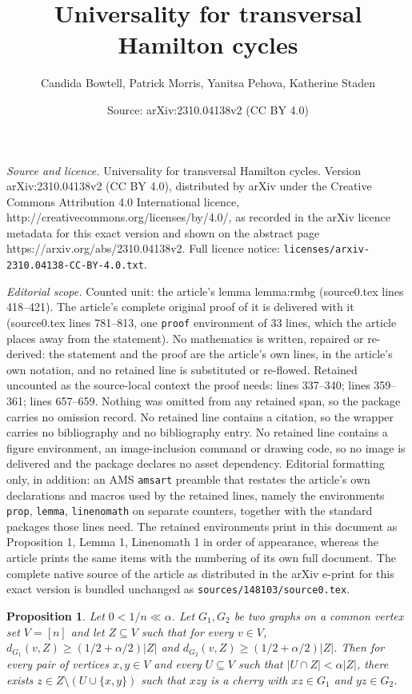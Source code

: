 \documentclass[10pt,a4paper]{amsart}
\title{Universality for transversal Hamilton cycles}
\author{Candida Bowtell, Patrick Morris, Yanitsa Pehova, Katherine Staden}
\date{Source: arXiv:2310.04138v2 (CC BY 4.0)}
\newtheorem{prop}{Proposition}
\begin{document}
\maketitle

\noindent\emph{Source and licence.} Universality for transversal Hamilton cycles. Version arXiv:2310.04138v2 (CC BY 4.0), distributed by arXiv under the Creative Commons Attribution 4.0 International licence, http://creativecommons.org/licenses/by/4.0/, as recorded in the arXiv licence metadata for this exact version and shown on the abstract page https://arxiv.org/abs/2310.04138v2. Full licence notice: \texttt{licenses/arxiv-2310.04138-CC-BY-4.0.txt}.\par\smallskip

\noindent\textit{Editorial scope.} Counted unit: the article's lemma lemma:rmbg (source0.tex lines 418--421). The article's complete original proof of it is delivered with it (source0.tex lines 781--813, one \texttt{proof} environment of 33 lines, which the article places away from the statement). No mathematics is written, repaired or re-derived: the statement and the proof are the article's own lines, in the article's own notation, and no retained line is substituted or re-flowed.  Retained uncounted as the source-local context the proof needs: lines 337--340; lines 359--361; lines 657--659.  Nothing was omitted from any retained span, so the package carries no omission record.  No retained line contains a citation, so the wrapper carries no bibliography and no bibliography entry.  No retained line contains a figure environment, an image-inclusion command or drawing code, so no image is delivered and the package declares no asset dependency.  Editorial formatting only, in addition: an AMS \texttt{amsart} preamble that restates the article's own declarations and macros used by the retained lines, namely the environments \texttt{prop}, \texttt{lemma}, \texttt{linenomath} on separate counters, together with the standard packages those lines need.  The retained environments print in this document as Proposition 1, Lemma 1, Linenomath 1 in order of appearance, whereas the article prints the same items with the numbering of its own full document.  The complete native source of the article as distributed in the arXiv e-print for this exact version is bundled unchanged as \texttt{sources/148103/source0.tex}.
\begin{prop}\label{prop:cherries}
Let $0 < 1/n \ll \alpha$.
Let $G_1,G_2$ be two graphs on a common vertex set $V=[n]$ and  let $Z\subseteq V$ such that for every $v\in V$, $ d_{G_1}(v,Z)\ge (1/2+\alpha/2)|Z|$ and $ d_{G_2}(v, Z)\ge (1/2+\alpha/2)|Z|$. Then for every pair of vertices $x, y \in V$ and every $U \subseteq V$ such that $|U\cap Z| <\alpha|Z|$, there exists $z \in Z \setminus (U \cup \{x,y\})$ such that $xzy$ is a cherry with $xz \in G_1$ and $yz \in G_2$. 
\end{prop}
\end{document}
